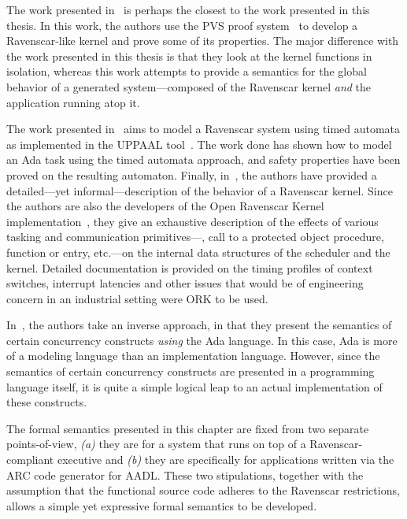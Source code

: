 The work presented in~\cite{fowler@rtss97} is perhaps the closest to
the work presented in this thesis. In this work, the authors use the
PVS proof system~\cite{owre@cade11} to develop a Ravenscar-like kernel
and prove some of its properties. The major difference with the work
presented in this thesis is that they look at the kernel functions in
isolation, whereas this work attempts to provide a semantics for the
global behavior of a generated system---composed of the Ravenscar
kernel \emph{and} the application running atop it.

The work presented in~\cite{lundqvist@rtcsa99} aims to model a
Ravenscar system using timed automata as implemented in the UPPAAL
tool~\cite{larsen@jsttt97}. The work done has shown how to model an
Ada task using the timed automata approach, and safety properties have
been proved on the resulting automaton. Finally,
in~\cite{vardanega@rts05}, the authors have provided a detailed---yet
informal---description of the behavior of a Ravenscar kernel. Since
the authors are also the developers of the Open Ravenscar Kernel
implementation~\cite{puente@ae00}, they give an exhaustive description
of the effects of various tasking and communication
primitives---, call to a protected object procedure,
function or entry, etc.---on the internal data structures of the
scheduler and the kernel. Detailed documentation is provided on the
timing profiles of context switches, interrupt latencies and other
issues that would be of engineering concern in an industrial setting
were ORK to be used.

In~\cite{peyre@ae07}, the authors take an inverse approach, in that
they present the semantics of certain concurrency constructs
\emph{using} the Ada language. In this case, Ada is more of a modeling
language than an implementation language. However, since the semantics
of certain concurrency constructs are presented in a programming
language itself, it is quite a simple logical leap to an actual
implementation of these constructs.

The formal semantics presented in this chapter are fixed from two
separate points-of-view, \emph{(a)} they are for a system that runs on
top of a Ravenscar-compliant executive and \emph{(b)} they are
specifically for applications written via the ARC code generator for
AADL. These two stipulations, together with the assumption that the
functional source code adheres to the Ravenscar restrictions, allows a
simple yet expressive formal semantics to be developed.

